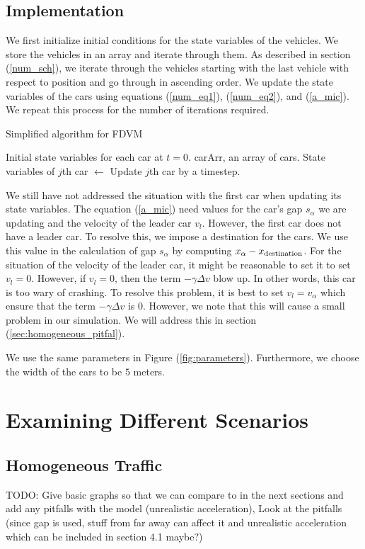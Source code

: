 \documentclass[12pt]{article}
\begin{document}
    \subsection{Implementation}\label{sec:implementation}
    We first initialize initial conditions for the state variables of the vehicles. We store the vehicles in an array and iterate through them. As described in section (\ref{num_sch}), we iterate through the vehicles starting with the last vehicle with respect to position and go through in ascending order. We update the state variables of the cars using equations (\ref{num_eq1}), (\ref{num_eq2}), and (\ref{a_mic}). We repeat this process for the number of iterations required. 
    \begin{algorithm}
      \caption{Simplified algorithm for FDVM}\label{alg:car-following}
      \begin{algorithmic}
      \Require Initial state variables for each car at $t=0$. 
      \Require carArr, an array of cars.
        \State State variables of $j$th car $\gets$ Update $j$th car by a timestep.
        \EndFor
      \EndFor
      \end{algorithmic}
      \end{algorithm}
    We still have not addressed the situation with the first car when updating its state variables. The equation (\ref{a_mic}) need values for the car's gap $s_\alpha$ we are updating and the velocity of the leader car $v_l$. However, the first car does not have a leader car. To resolve this, we impose a destination for the cars. We use this value in the calculation of gap $s_\alpha$ by computing $x_\alpha - x_{\rm destination}$. For the situation of the velocity of the leader car, it might be reasonable to set it to set $v_l = 0$. However, if $v_l=0$, then the term $-\gamma \Delta v$ blow up. In other words, this car is too wary of crashing. To resolve this problem, it is best to set $v_l = v_\alpha$ which ensure that the term $-\gamma \Delta v$ is $0$. However, we note that this will cause a small problem in our simulation. We will address this in section (\ref{sec:homogeneous_pitfal}). 
    
    We use the same parameters in Figure (\ref{fig:parameters}). Furthermore, we choose the width of the cars to be $5$ meters.
    \section{Examining Different Scenarios}
    \subsection{Homogeneous Traffic}
    TODO: Give basic graphs so that we can compare to in the next sections and add any pitfalls with the model (unrealistic acceleration), Look at the pitfalls (since gap is used, stuff from far away can affect it and unrealistic acceleration which can be included in section 4.1 maybe?)
\end{document}
